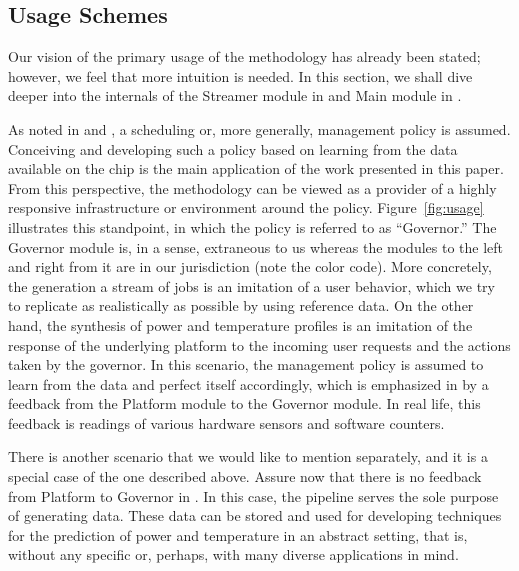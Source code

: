 \subsection{Usage Schemes} 
 Our vision of the primary usage of the
methodology has already been stated; however, we feel that more intuition is
needed. In this section, we shall dive deeper into the internals of the Streamer
module in  and Main module in .

As noted in  and , a scheduling or, more
generally, management policy is assumed. Conceiving and developing such a policy
based on learning from the data available on the chip is the main application of
the work presented in this paper. From this perspective, the methodology can be
viewed as a provider of a highly responsive infrastructure or environment around
the policy. Figure~\ref{fig:usage} illustrates this standpoint, in which the
policy is referred to as ``Governor.'' The Governor module is, in a sense,
extraneous to us whereas the modules to the left and right from it are in our
jurisdiction (note the color code). More concretely, the generation a stream of
jobs is an imitation of a user behavior, which we try to replicate as
realistically as possible by using reference data. On the other hand, the
synthesis of power and temperature profiles is an imitation of the response of
the underlying platform to the incoming user requests and the actions taken by
the governor. In this scenario, the management policy is assumed to learn from
the data and perfect itself accordingly, which is emphasized in  by
a feedback from the Platform module to the Governor module. In real life, this
feedback is readings of various hardware sensors and software counters.

There is another scenario that we would like to mention separately, and it is a
special case of the one described above. Assure now that there is no feedback
from Platform to Governor in . In this case, the pipeline serves the
sole purpose of generating data. These data can be stored and used for
developing techniques for the prediction of power and temperature in an abstract
setting, that is, without any specific or, perhaps, with many diverse
applications in mind.
